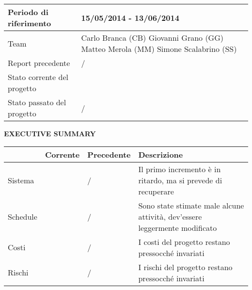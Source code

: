 
\begin{table}[ht]
\centering
\begin{tabular}{|g|p{8cm}|}
 \hline
  Periodo di riferimento		& 15/05/2014 - 13/06/2014\\
  \hline
  Team 					& Carlo Branca (CB)\newline
  					Giovanni Grano (GG)\newline
  					Matteo Merola (MM)\newline
  					Simone Scalabrino (SS)\\
  \hline
  Report precedente			& /\\
  \hline
  Stato corrente del progetto		& \\
  \hline
  Stato passato del progetto		& /\\
  \hline
\end{tabular}
\end{table}

\begin{center} \textbf{EXECUTIVE SUMMARY} \end{center}
\begin{table}[ht]
\centering
\begin{tabular}{|h|p{2cm}|p{2cm}|p{5.5cm}|}
  \hline
  	& Corrente		& Precedente		& Descrizione\\
  \hline
  Sistema		& 	& /			& \footnotesize Il primo incremento è in ritardo, ma si prevede di recuperare\\
  \hline
  Schedule		& 	& /			& \footnotesize Sono state stimate male alcune attività, dev'essere leggermente modificato\\
  \hline
  Costi			& 	& /			& \footnotesize I costi del progetto restano pressocché invariati\\
  \hline
  Rischi		& 	& /			& \footnotesize I rischi del progetto restano pressocché invariati\\
  \hline
\end{tabular}
\end{table}

